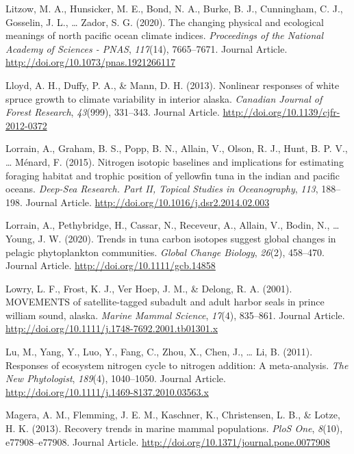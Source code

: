 \documentclass [11pt, proquest] {uwthesis}[2015/03/03]
\begin{document}
\hypertarget{ref-Litzow2020}{}
Litzow, M. A., Hunsicker, M. E., Bond, N. A., Burke, B. J., Cunningham,
C. J., Gosselin, J. L., \ldots{} Zador, S. G. (2020). The changing
physical and ecological meanings of north pacific ocean climate indices.
\emph{Proceedings of the National Academy of Sciences - PNAS},
\emph{117}(14), 7665--7671. Journal Article.
\url{http://doi.org/10.1073/pnas.1921266117}

\hypertarget{ref-Lloyd2013}{}
Lloyd, A. H., Duffy, P. A., \& Mann, D. H. (2013). Nonlinear responses
of white spruce growth to climate variability in interior alaska.
\emph{Canadian Journal of Forest Research}, \emph{43}(999), 331--343.
Journal Article. \url{http://doi.org/10.1139/cjfr-2012-0372}

\hypertarget{ref-Lorrain2015}{}
Lorrain, A., Graham, B. S., Popp, B. N., Allain, V., Olson, R. J., Hunt,
B. P. V., \ldots{} Ménard, F. (2015). Nitrogen isotopic baselines and
implications for estimating foraging habitat and trophic position of
yellowfin tuna in the indian and pacific oceans. \emph{Deep-Sea
Research. Part II, Topical Studies in Oceanography}, \emph{113},
188--198. Journal Article.
\url{http://doi.org/10.1016/j.dsr2.2014.02.003}

\hypertarget{ref-Lorrain2020}{}
Lorrain, A., Pethybridge, H., Cassar, N., Receveur, A., Allain, V.,
Bodin, N., \ldots{} Young, J. W. (2020). Trends in tuna carbon isotopes
suggest global changes in pelagic phytoplankton communities.
\emph{Global Change Biology}, \emph{26}(2), 458--470. Journal Article.
\url{http://doi.org/10.1111/gcb.14858}

\hypertarget{ref-Lowry2001}{}
Lowry, L. F., Frost, K. J., Ver Hoep, J. M., \& Delong, R. A. (2001).
MOVEMENTS of satellite-tagged subadult and adult harbor seals in prince
william sound, alaska. \emph{Marine Mammal Science}, \emph{17}(4),
835--861. Journal Article.
\url{http://doi.org/10.1111/j.1748-7692.2001.tb01301.x}

\hypertarget{ref-Lu2011}{}
Lu, M., Yang, Y., Luo, Y., Fang, C., Zhou, X., Chen, J., \ldots{} Li, B.
(2011). Responses of ecosystem nitrogen cycle to nitrogen addition: A
meta-analysis. \emph{The New Phytologist}, \emph{189}(4), 1040--1050.
Journal Article. \url{http://doi.org/10.1111/j.1469-8137.2010.03563.x}

\hypertarget{ref-Magera2013}{}
Magera, A. M., Flemming, J. E. M., Kaschner, K., Christensen, L. B., \&
Lotze, H. K. (2013). Recovery trends in marine mammal populations.
\emph{PloS One}, \emph{8}(10), e77908--e77908. Journal Article.
\url{http://doi.org/10.1371/journal.pone.0077908}
\end{document}
